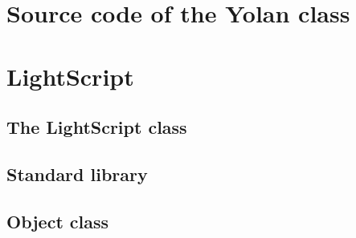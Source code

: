 \documentclass[11pt]{report}
\begin{document}
%
%

\newpage
{}



\appendix



\chapter{Source code of the Yolan class}


\chapter{LightScript}
\section{The LightScript class}

\section{Standard library}

\section{Object class}



\newpage
{}
\printindex
\end{document}
